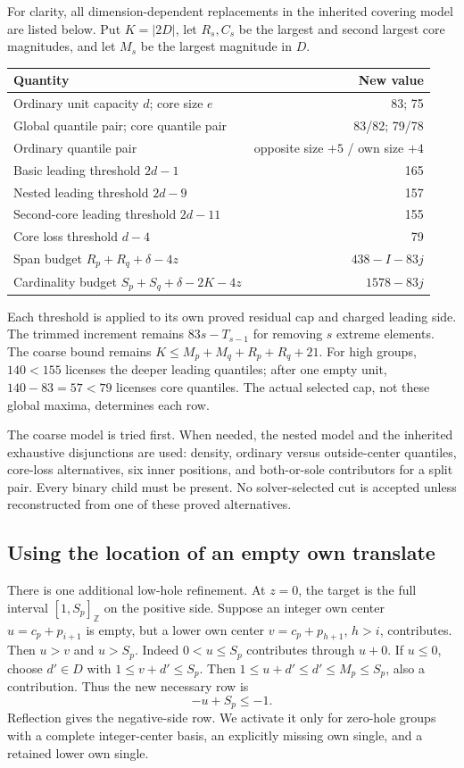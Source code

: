 \documentclass[11pt,a4paper]{article}
\newcommand{\Z}{\mathbb Z}
\begin{document}
For clarity, all dimension-dependent replacements in the inherited
covering model are listed below. Put $K=|2D|$, let $R_s,C_s$ be the
largest and second largest core magnitudes, and let $M_s$ be the
largest magnitude in $D$.
\begin{center}\small
\begin{tabular}{lr}\toprule
Quantity&New value\\\midrule
Ordinary unit capacity $d$; core size $e$&83; 75\\
Global quantile pair; core quantile pair&83/82; 79/78\\
Ordinary quantile pair&opposite size $+5$ / own size $+4$\\
Basic leading threshold $2d-1$&165\\
Nested leading threshold $2d-9$&157\\
Second-core leading threshold $2d-11$&155\\
Core loss threshold $d-4$&79\\
Span budget $R_p+R_q+\delta-4z$&$438-I-83j$\\
Cardinality budget $S_p+S_q+\delta-2K-4z$&$1578-83j$\\\bottomrule
\end{tabular}
\end{center}
Each threshold is applied to its own proved residual cap and charged
leading side. The trimmed increment remains $83s-T_{s-1}$ for removing
$s$ extreme elements. The coarse bound remains
$K\le M_p+M_q+R_p+R_q+21$.
For high groups, $140<155$ licenses the deeper leading quantiles;
after one empty unit, $140-83=57<79$ licenses core quantiles.
The actual selected cap, not these global maxima, determines each row.

The coarse model is tried first. When needed, the nested model and
the inherited exhaustive disjunctions are used: density, ordinary versus
outside-center quantiles, core-loss alternatives, six inner positions,
and both-or-sole contributors for a split pair. Every binary child must
be present. No solver-selected cut is accepted unless reconstructed from
one of these proved alternatives.

\subsection{Using the location of an empty own translate}
There is one additional low-hole refinement. At $z=0$, the target is
the full interval $[1,S_p]_{\Z}$ on the positive side. Suppose an
integer own center $u=c_p+p_{i+1}$ is empty, but a lower own center
$v=c_p+p_{h+1}$, $h>i$, contributes. Then $u>v$ and $u>S_p$.
Indeed $0<u\le S_p$ contributes through $u+0$. If $u\le0$, choose
$d'\in D$ with $1\le v+d'\le S_p$. Then
$1\le u+d'\le d'\le M_p\le S_p$, also a contribution.
Thus the new necessary row is
\[
 -u+S_p\le-1.
\]
Reflection gives the negative-side row. We activate it only for
zero-hole groups with a complete integer-center basis, an explicitly
missing own single, and a retained lower own single.
\end{document}
